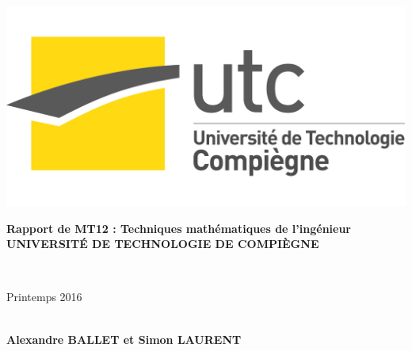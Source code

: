 \documentclass[a4paper,12pt]{report}
\begin{document}

\thispagestyle{empty}

\includegraphics[scale=0.06]{logo_utc.png}

{\large

\vspace*{1cm}

\begin{center}

{\bf Rapport de MT12 : Techniques math\'ematiques de l'ing\'enieur \\ UNIVERSIT\'E DE TECHNOLOGIE DE COMPI\`EGNE}

\vspace*{1 cm}
 \\ 
\vspace*{1cm}

Printemps 2016

\vspace*{1cm}
 \\
\vspace*{1cm}
{\Large {\bf Alexandre BALLET et Simon LAURENT}}
\vspace*{2cm}
\\
\vspace*{2 cm}
\end{center}

\\
\vspace*{1 cm}
\\
\\
\vspace*{1 cm}
\\
}
\end{document}
